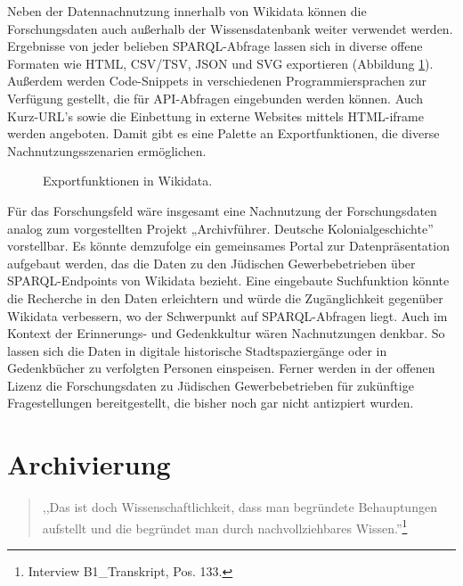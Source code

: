 Neben der Datennachnutzung innerhalb von Wikidata können die Forschungsdaten auch außerhalb der Wissensdatenbank weiter verwendet werden. Ergebnisse von jeder belieben SPARQL-Abfrage lassen sich in diverse offene Formaten wie HTML, CSV/TSV, JSON und SVG exportieren (Abbildung \ref{fig:wikidataexport}). Außerdem werden Code-Snippets in verschiedenen Programmiersprachen zur Verfügung gestellt, die für API-Abfragen eingebunden werden können. Auch Kurz-URL's sowie die Einbettung in externe Websites mittels HTML-iframe werden angeboten. Damit gibt es eine Palette an Exportfunktionen, die diverse Nachnutzungsszenarien ermöglichen.

\begin{figure}[h]
    \centering
    \caption{Exportfunktionen in Wikidata.}
    \label{fig:wikidataexport}
\end{figure}

Für das Forschungsfeld wäre insgesamt eine Nachnutzung der Forschungsdaten analog zum vorgestellten Projekt „Archivführer. Deutsche Kolonialgeschichte'' vorstellbar. Es könnte demzufolge ein gemeinsames Portal zur Datenpräsentation aufgebaut werden, das die Daten zu den Jüdischen Gewerbebetrieben über SPARQL-Endpoints von Wikidata bezieht. Eine eingebaute Suchfunktion könnte die Recherche in den Daten erleichtern und würde die Zugänglichkeit gegenüber Wikidata verbessern, wo der Schwerpunkt auf SPARQL-Abfragen liegt. Auch im Kontext der Erinnerungs- und Gedenkkultur wären Nachnutzungen denkbar. So lassen sich die Daten in digitale historische Stadtspaziergänge oder in Gedenkbücher zu verfolgten Personen einspeisen. Ferner werden in der offenen Lizenz die Forschungsdaten zu Jüdischen Gewerbebetrieben für zukünftige Fragestellungen bereitgestellt, die bisher noch gar nicht antizpiert wurden.

\section{Archivierung}

\begin{quote}
    ,,Das ist doch Wissenschaftlichkeit, dass man begründete Behauptungen aufstellt und die begründet man durch nachvollziehbares Wissen.''\footnote{Interview B1\_Transkript, Pos. 133.}
\end{quote}

